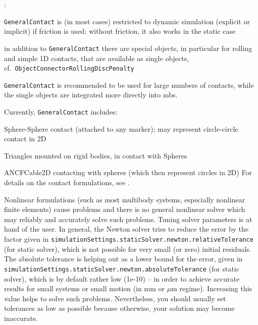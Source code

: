 \noindent {}:
\bi
\item \texttt{GeneralContact} is (in most cases) restricted to dynamic simulation (explicit or implicit) if friction is used; without friction, it also works in the static case
\item in addition to \texttt{GeneralContact} there are special objects, in particular for rolling and simple 1D contacts, that are available as single objects, cf.\ \texttt{ObjectConnectorRollingDiscPenalty}
\item \texttt{GeneralContact} is recommended to be used for large numbers of contacts, while the single objects are integrated more directly into mbs.
\ei

\noindent Currently, \texttt{GeneralContact} includes:
\bi
  \item Sphere-Sphere contact (attached to any marker); may represent circle-circle contact in 2D
  \item Triangles mounted on rigid bodies, in contact with Spheres
  \item ANCFCable2D contacting with spheres (which then represent circles in 2D)
\ei
For details on the contact formulations, see .

\label{secConvergenceProblems}
Nonlinear formulations (such as most multibody systems, especially nonlinear finite elements) cause problems and there is no general nonlinear solver which may reliably and accurately solve such problems.
Tuning solver parameters is at hand of the user. 
In general, the Newton solver tries to reduce the error by the factor given in \texttt{simulationSettings.staticSolver.newton.relativeTolerance} (for static solver), which is not possible for very small (or zero) initial residuals. The absolute tolerance is helping out as a lower bound for the error, given in \texttt{simulationSettings.staticSolver.newton.absoluteTolerance} (for static solver), which is by default rather low (1e-10) -- in order to achieve accurate results for small systems or small motion (in mm or $\mu$m regime). Increasing this value helps to solve such problems. Nevertheless, you should usually set tolerances as low as possible because otherwise, your solution may become inaccurate.

